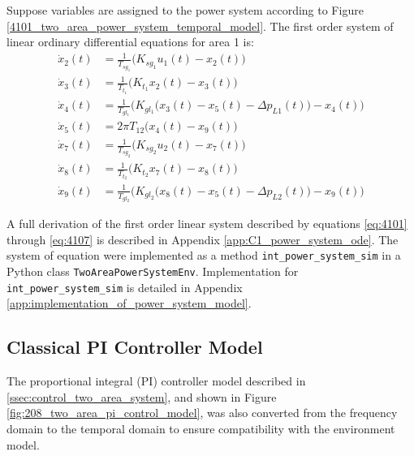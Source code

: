 Suppose variables are assigned to the power system according to Figure \ref{4101_two_area_power_system_temporal_model}. The first order system of linear ordinary differential equations for area 1 is:
\begin{align}
	\dot{x}_2(t) &= \frac{1}{T_{sg_1}}\big( K_{sg_1} u_1(t) - x_2(t) \big) \label{eq:4101} \\
	\dot{x}_3(t) &= \frac{1}{T_{t_1}} \big( K_{t_1} x_2(t) - x_3(t) \big) \label{eq:4102} \\
	\dot{x}_4(t) &= \frac{1}{T_{gl_1}} \bigg( K_{gl_1} \big( x_3(t) - x_5(t) - \Delta p_{L1}(t) \big) - x_4(t) \bigg) \label{eq:4103}  \\
	\dot{x}_5(t) &= 2 \pi T_{12} \big( x_4(t) - x_9(t) \big) \label{eq:4104} \\
	\dot{x}_7(t) &= \frac{1}{T_{sg_2}}\big( K_{sg_2} u_2(t) - x_7(t) \big) \label{eq:4105} \\
	\dot{x}_8(t) &= \frac{1}{T_{t_2}} \big( K_{t_2} x_7(t) - x_8(t) \big) \label{eq:4106} \\
	\dot{x}_9(t) &= \frac{1}{T_{gl_2}} \bigg( K_{gl_2} \big( x_8(t) - x_5(t) - \Delta p_{L2}(t) \big) - x_9(t) \bigg) \label{eq:4107}
\end{align}

A full derivation of the first order linear system described by equations \ref{eq:4101} through \ref{eq:4107} is described in Appendix \ref{app:C1_power_system_ode}. The system of equation were implemented as a method \verb|int_power_system_sim| in a Python class \verb|TwoAreaPowerSystemEnv|. Implementation for \verb|int_power_system_sim| is detailed in Appendix \ref{app:implementation_of_power_system_model}.




\subsection{Classical PI Controller Model}
The proportional integral (PI) controller model described in \textsection \ref{ssec:control_two_area_system}, and shown in Figure \ref{fig:208_two_area_pi_control_model}, was also converted from the frequency domain to the temporal domain to ensure compatibility with the environment model.

